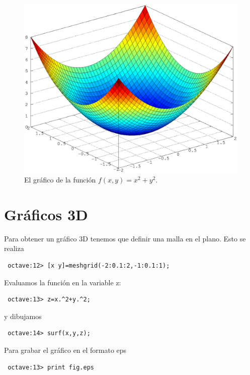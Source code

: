 \begin{figure} 
      \vspace{-10pt}
  \begin{figurebox}
\centering
\includegraphics[scale=.4]{fig3.eps}
\caption{El gráfico de la función $f(x,y)=x^2+y^2$.}
\label{fig:3}
\end{figurebox}
\end{figure}

\section{Gráficos 3D}
Para obtener un gráfico 3D tenemos que definir una malla en el plano. Esto se realiza
\begin{octaveboxI}
{\small 
\begin{verbatim}
 octave:12> [x y]=meshgrid(-2:0.1:2,-1:0.1:1);
\end{verbatim}}
\end{octaveboxI}
Evaluamos la función en la variable z:
\begin{octaveboxI}
\begin{verbatim}
 octave:13> z=x.^2+y.^2;
\end{verbatim}
\end{octaveboxI}
y dibujamos
\begin{octaveboxI}
\begin{verbatim}
 octave:14> surf(x,y,z);
\end{verbatim}
\end{octaveboxI}
Para grabar el gráfico en el formato eps
\begin{octaveboxI}
\begin{verbatim}
 octave:13> print fig.eps
\end{verbatim}
\end{octaveboxI}

